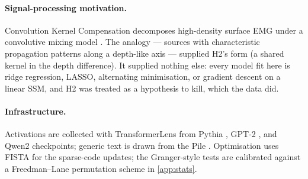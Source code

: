 \paragraph{Signal-processing motivation.}
Convolution Kernel Compensation decomposes high-density surface EMG under a
convolutive mixing model \citep{holobar2007multichannel}. The analogy ---
sources with characteristic propagation patterns along a depth-like axis ---
supplied H2's form (a shared kernel in the depth difference). It supplied
nothing else: every model fit here is ridge regression, LASSO, alternating
minimisation, or gradient descent on a linear SSM, and H2 was treated as a
hypothesis to kill, which the data did.

\paragraph{Infrastructure.}
Activations are collected with TransformerLens \citep{nanda2022transformerlens}
from Pythia \citep{biderman2023pythia}, GPT-2 \citep{radford2019language}, and
Qwen2 \citep{yang2024qwen2} checkpoints; generic
text is drawn from the Pile \citep{gao2020pile}. Optimisation uses FISTA
\citep{beck2009fista} for the sparse-code updates; the Granger-style tests are
calibrated against a Freedman--Lane permutation scheme
\citep{freedman1983nonstochastic} in \cref{app:stats}.
